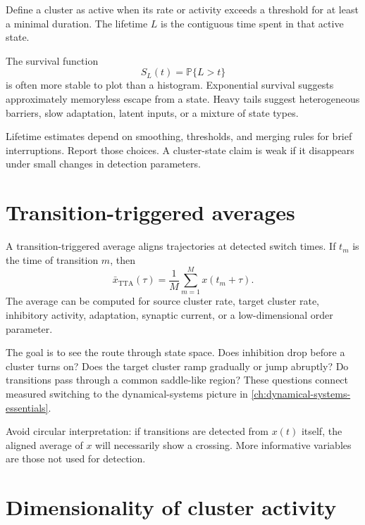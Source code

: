 Define a cluster as active when its rate or activity exceeds a threshold for at least a minimal duration. The lifetime $L$ is the contiguous time spent in that active state.

The survival function
%
\begin{equation}
  S_L(t)=\mathbb{P}\{L>t\}
  \label{eq:lifetime-survival}
\end{equation}
%
is often more stable to plot than a histogram. Exponential survival suggests approximately memoryless escape from a state. Heavy tails suggest heterogeneous barriers, slow adaptation, latent inputs, or a mixture of state types.

Lifetime estimates depend on smoothing, thresholds, and merging rules for brief interruptions. Report those choices. A cluster-state claim is weak if it disappears under small changes in detection parameters.

\section{Transition-triggered averages}
\label{sec:transition-triggered-averages}

A transition-triggered average aligns trajectories at detected switch times. If $t_m$ is the time of transition $m$, then
%
\begin{equation}
  \bar x_{\mathrm{TTA}}(\tau)
  =
  \frac{1}{M}\sum_{m=1}^M x(t_m+\tau).
  \label{eq:transition-triggered-average}
\end{equation}
%
The average can be computed for source cluster rate, target cluster rate, inhibitory activity, adaptation, synaptic current, or a low-dimensional order parameter.

The goal is to see the route through state space. Does inhibition drop before a cluster turns on? Does the target cluster ramp gradually or jump abruptly? Do transitions pass through a common saddle-like region? These questions connect measured switching to the dynamical-systems picture in \cref{ch:dynamical-systems-essentials}.

Avoid circular interpretation: if transitions are detected from $x(t)$ itself, the aligned average of $x$ will necessarily show a crossing. More informative variables are those not used for detection.

\section{Dimensionality of cluster activity}
\label{sec:dimensionality-cluster-activity}

